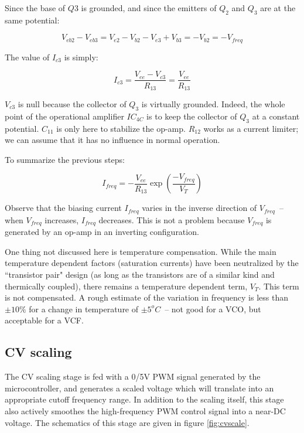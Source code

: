 \documentclass[a4paper,11pt]{article}
\begin{document}
Since the base of $Q3$ is grounded, and since the emitters of $Q_2$ and $Q_3$ are at the same potential:

\begin{equation}
V_{eb2} - V_{eb3} = V_{e2} - V_{b2} - V_{e3} + V_{b3} = -V_{b2} = -V_{freq}
\end{equation}

The value of $I_{c3}$ is simply:

\begin{equation}
I_{c3} = \frac{V_{ee} - V_{c3}}{R_{13}} = \frac{V_{ee}}{R_{13}}
\end{equation}

$V_{c3}$ is null because the collector of $Q_3$ is virtually grounded. Indeed, the whole point of the operational amplifier $IC_{4C}$ is to keep the collector of $Q_3$ at a constant potential. $C_{11}$ is only here to stabilize the op-amp. $R_{12}$ works as a current limiter; we can assume that it has no influence in normal operation.

To summarize the previous steps:

\begin{equation}
I_{freq} = -\frac{V_{ee}}{R_{13}} \exp \left(\frac{-V_{freq}}{V_T} \right)
\end{equation}

Observe that the biasing current $I_{freq}$ varies in the inverse direction of $V_{freq}$~-- when $V_{freq}$ increases, $I_{freq}$ decreases. This is not a problem because $V_{freq}$ is generated by an op-amp in an inverting configuration.

One thing not discussed here is temperature compensation. While the main temperature dependent factors (saturation currents) have been neutralized by the ``transistor pair" design (as long as the transistors are of a similar kind and thermically coupled), there remains a temperature dependent term, $V_T$. This term is not compensated. A rough estimate of the variation in frequency is less than $\pm 10\%$ for a change in temperature of $\pm 5^oC$~-- not good for a VCO, but acceptable for a VCF.

\subsection{CV scaling}

The CV scaling stage is fed with a 0/5V PWM signal generated by the microcontroller, and generates a scaled voltage which will translate into an appropriate cutoff frequency range. In addition to the scaling itself, this stage also actively smoothes the high-frequency PWM control signal into a near-DC voltage. The schematics of this stage are given in figure \ref{fig:cvscale}.
\end{document}
